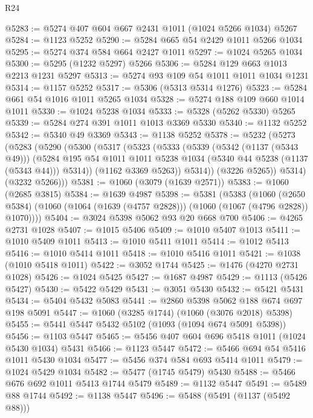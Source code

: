 \begin{lexlean}{R24}
\begin{coremodule}
@5283 := @5274 @407 @604 @667 @2431 @1011 (@1024 @5266 @1034) @5267
@5284 := @1123 @5252
@5290 := @5284 @665 @54 @2429 @1011 @5266 @1034
@5295 := @5274 @374 @584 @664 @2427 @1011
@5297 := @1024 @5265 @1034
@5300 := @5295 (@1232 @5297) @5266
@5306 := @5284 @129 @663 @1013 @2213 @1231 @5297
@5313 := @5274 @93 @109 @54 @1011 @1011 @1034 @1231
@5314 := @1157 @5252
@5317 := @5306 (@5313 @5314 @1276)
@5323 := @5284 @661 @54 @1016 @1011 @5265 @1034
@5328 := @5274 @188 @109 @660 @1014 @1011
@5330 := @1024 @5238 @1034
@5333 := @5328 (@5262 @5330) @5265
@5339 := @5284 @274 @391 @1011 @1013 @3369 @5330
@5340 := @1132 @5252
@5342 := @5340 @49 @3369
@5343 := @1138 @5252
@5378 := @5232
    (@5273
      (@5283
        (@5290
          (@5300
            (@5317
              (@5323
                (@5333
                  (@5339
                    (@5342 (@1137 (@5343 @49)))
                    (@5284
                      @195
                      @54
                      @1011
                      @1011
                      @5238
                      @1034
                      (@5340 @44 @5238 (@1137 (@5343 @44)))
                      @5314))
                  (@1162 @3369 @5263))
                @5314))
            (@3226 @5265))
          @5314)
        (@3232 @5266)))
@5381 := @1060 (@3079 (@1639 @2571))
@5383 := @1060 (@2685 @3815)
@5384 := @1639 @4987
@5398 := @5381
    (@5383
      (@1060
        (@2650 @5384)
        (@1060 (@1064 (@1639 (@4757 @2828))) (@1060 (@1067 (@4796 @2828)) @1070))))
@5404 := @3024 @5398 @5062 @93 @20 @668 @700
@5406 := @4265 @2731 @1028
@5407 := @1015 @5406
@5409 := @1010 @5407 @1013
@5411 := @1010 @5409 @1011
@5413 := @1010 @5411 @1011
@5414 := @1012 @5413
@5416 := @1010 @5414 @1011
@5418 := @1010 @5416 @1011
@5421 := @1038 (@1010 @5418 @1011)
@5422 := @3052 @1744
@5425 := @1476 (@4270 @2731 @1028)
@5426 := @1024 @5425
@5427 := @1687 @4987
@5429 := @1113 (@5426 @5427)
@5430 := @5422 @5429
@5431 := @3051 @5430
@5432 := @5421 @5431
@5434 := @5404 @5432 @5083
@5441 := @2860 @5398 @5062 @188 @674 @697 @198 @5091
@5447 := @1060 (@3285 @1744) (@1060 (@3076 @2018) @5398)
@5455 := @5441 @5447 @5432 @5102 (@1093 (@1094 @674 @5091 @5398))
@5456 := @1103 @5447
@5465 := @5456 @407 @604 @696 @5418 @1011 (@1024 @5430 @1034) @5431
@5466 := @1123 @5447
@5472 := @5466 @694 @54 @5416 @1011 @5430 @1034
@5477 := @5456 @374 @584 @693 @5414 @1011
@5479 := @1024 @5429 @1034
@5482 := @5477 (@1745 @5479) @5430
@5488 := @5466 @676 @692 @1011 @5413 @1744 @5479
@5489 := @1132 @5447
@5491 := @5489 @88 @1744
@5492 := @1138 @5447
@5496 := @5488 (@5491 (@1137 (@5492 @88)))

\end{coremodule}
\end{lexlean}
